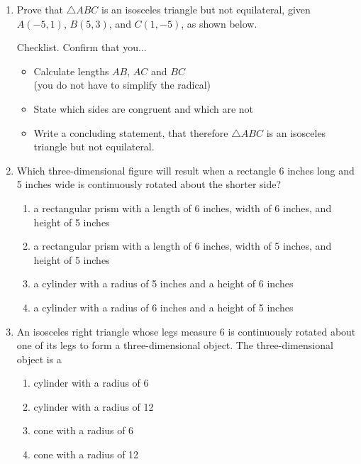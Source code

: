 \documentclass[12pt, twoside]{article}
\begin{document}
\begin{enumerate}
\newpage
   \item Prove that $\triangle ABC$ is an isosceles triangle but not equilateral, given $A(-5,1)$, $B(5,3)$, and $C(1,-5)$, as shown below.
     \begin{multicols}{2}
       Checklist. Confirm that you...
       \begin{itemize}
         \item Calculate lengths $AB$, $AC$ and $BC$\\
         (you do not have to simplify the radical)
         \item State which sides are congruent and which are not
         \item Write a concluding statement, that therefore $\triangle ABC$ is an isosceles triangle but not equilateral.
       \end{itemize}
     \end{multicols}

 \newpage
   \item Which three-dimensional figure will result when a rectangle 6 inches long and 5 inches wide is continuously rotated about the shorter side?
     \begin{enumerate}
       \item a rectangular prism with a length of 6 inches, width of 6 inches, and height of 5 inches
       \item a rectangular prism with a length of 6 inches, width of 5 inches, and height of 5 inches
       \item a cylinder with a radius of 5 inches and a height of 6 inches
       \item a cylinder with a radius of 6 inches and a height of 5 inches
     \end{enumerate} \vspace{1cm}

  \item An isosceles right triangle whose legs measure 6 is continuously rotated about one of its legs to form a three-dimensional object. The three-dimensional object is a
   \begin{enumerate}
     \item cylinder with a radius of 6
     \item cylinder with a radius of 12
     \item cone with a radius of 6
     \item cone with a radius of 12
   \end{enumerate} \vspace{1cm}


\end{enumerate}
\end{document}
